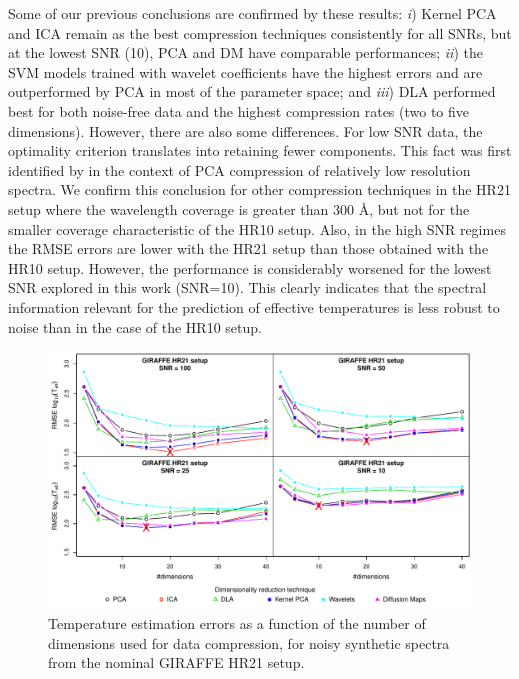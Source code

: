 \documentclass[a4paper,fleqn,usenatbib]{mnras}
\begin{document}
{{{Some of our previous conclusions are confirmed by these results:
{\it i}) Kernel PCA and ICA remain as the best compression techniques 
consistently for all SNRs, but at the lowest SNR (10), PCA and DM have 
comparable performances;  {\it ii}) the SVM models trained with wavelet 
coefficients have the highest errors and are outperformed by PCA 
in most of the parameter space; and {\it iii}) DLA performed best for 
both noise-free data and the highest compression rates (two to five 
dimensions). However, there are also some differences. For low SNR 
data, the optimality criterion translates into retaining fewer components. 
This fact was first identified by \cite{Bailer-Jones1998} in the context of 
PCA compression of relatively low resolution spectra. We confirm this 
conclusion for other compression techniques in the HR21 setup where the 
wavelength coverage is greater than 300 {\AA}, but not for the smaller 
coverage characteristic of the HR10 setup.
Also, in the high SNR regimes the RMSE errors are lower with the HR21 
setup than those obtained with the HR10 setup. However, the performance is 
considerably worsened for the lowest SNR explored in this work (SNR=10). 
This clearly indicates that the spectral information relevant for the 
prediction of effective temperatures is less robust to noise than in 
the case of the HR10 setup.

\begin{figure}
\centering\includegraphics[width=\textwidth]{flamesHR21_Teff_log_BestSVM_N-RMSE_test.pdf}
\caption{Temperature estimation errors as a function of the number of
  dimensions used for data compression, for noisy synthetic
  spectra from the nominal GIRAFFE HR21 setup.}
\label{fig:02hr21}
\end{figure}


}}}
\end{document}
